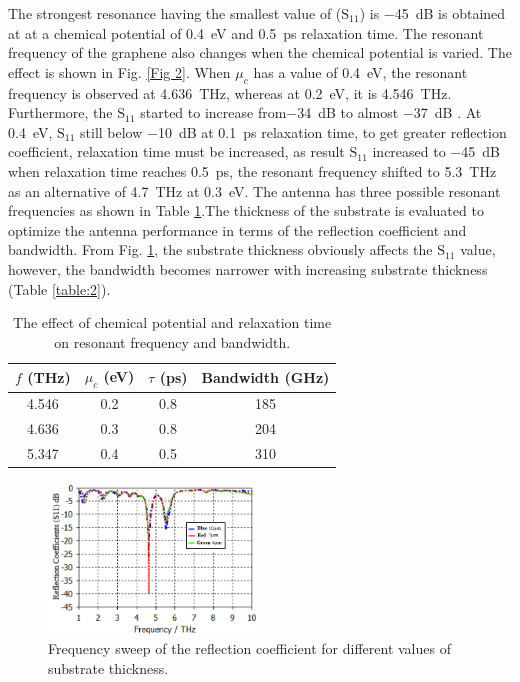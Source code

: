 \documentclass[12pt]{suhbook}
\begin{document}
% 
The strongest resonance having the smallest value of ($\mathrm{S_{11}}$) is \SI{-45}{\dB} is obtained at at a chemical potential of \SI{0.4}{\eV} and \SI{0.5}{\ps} relaxation time. The resonant frequency of the graphene also changes when the chemical potential is varied. The effect is shown in Fig. \ref{Fig 2}. When $\mu_c$ has a value of \SI{0.4}{\eV}, the resonant frequency is observed at \SI{4.636}{\THz}, whereas at \SI{0.2}{\eV}, it is \SI{4.546}{\THz}. Furthermore,  the $\mathrm{S_{11}}$ started to increase from\SI{-34}{\dB} to almost \SI{-37}{\dB} . At \SI{0.4}{\eV}, $\mathrm{S_{11}}$ still below \SI{-10}{\dB} at \SI{0.1}{\ps } relaxation time, to get greater reflection coefficient, relaxation time must be increased, as result $\mathrm{S_{11}}$ increased to \SI{-45}{\dB} when relaxation time reaches \SI{0.5}{\ps }, the resonant frequency shifted to \SI{5.3}{\THz} as an alternative of \SI{4.7}{\THz} at \SI{0.3}{\eV}. The antenna has three possible resonant frequencies as shown in Table \ref{table:1}.The thickness of the substrate is evaluated to optimize the antenna performance in terms of the reflection coefficient and bandwidth. From Fig. \ref{Fig 3}, the substrate thickness obviously affects the $\mathrm{S_{11}}$ value, however, the bandwidth becomes narrower with increasing substrate thickness (Table \ref{table:2}).
% 
\begin{table}[hbt!]
\centering
 \begin{tabular}[hbt!]{|c | c |c |c|} 
 \hline
 $f$ (THz) & $\mu_c$ (eV) & $\tau$ (ps) & Bandwidth (GHz)\\ [0.5ex] 
 \hline
 4.546  & 0.2  & 0.8  & 185  \\ 
 \hline
 4.636  & 0.3  & 0.8  & 204  \\
 \hline
 5.347  & 0.4  & 0.5  & 310  \\
 \hline
\end{tabular}
\caption{The effect of chemical potential and relaxation time on resonant frequency and bandwidth.}
\label{table:1}
\end{table}
% 
% 
\begin{figure}[hbt!]
    \centering
    \includegraphics[width=0.5\textwidth]{3}
    \caption{Frequency sweep of the reflection coefficient for different values of substrate thickness.}
    \label{Fig 3}
\end{figure}
\end{document}
